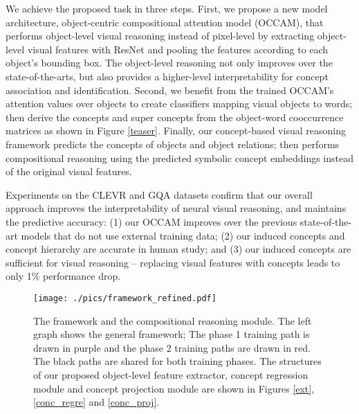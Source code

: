 \documentclass[10pt,twocolumn,letterpaper]{article}
\begin{document}
We achieve the proposed task in three steps.
First, we propose a new model architecture, object-centric compositional attention model (OCCAM), that performs object-level visual reasoning instead of pixel-level by extracting object-level visual features with ResNet \cite{He_2016_CVPR} and pooling the features according to each object's bounding box.
The object-level reasoning not only improves over the state-of-the-arts, but also provides a higher-level interpretability for concept association and identification.
Second, we benefit from the trained OCCAM's attention values over objects to create classifiers mapping visual objects to words; then derive the concepts and super concepts from the object-word cooccurrence matrices as shown in Figure \ref{teaser}.
Finally, our concept-based visual reasoning framework predicts the concepts of objects and object relations; then performs compositional reasoning using the predicted symbolic concept embeddings instead of the original visual features.






Experiments on the CLEVR and GQA datasets confirm that our overall approach improves the interpretability of neural visual reasoning, and maintains the predictive accuracy: (1) our OCCAM improves over the previous state-of-the-art models that do not use external training data; (2) our induced concepts and concept hierarchy are accurate in human study; and (3) our induced concepts are sufficient for visual reasoning -- replacing visual features with concepts leads to only 1\% performance drop.


\begin{figure*}[t]
\centering
\texttt{[image: ./pics/framework\_refined.pdf]}
\caption{\small{The framework and the compositional reasoning module. The left graph shows the general framework; The phase 1 training path is drawn in purple and the phase 2 training paths are drawn in red. The black paths are shared for both training phases. The structures of our proposed object-level feature extractor, concept regression module and concept projection module are shown in Figures \ref{ext}, \ref{conc_regre} and \ref{conc_proj}.}}
\label{framework}
\vspace{-3mm}
\end{figure*}

\vspace{-3mm}
\end{document}
